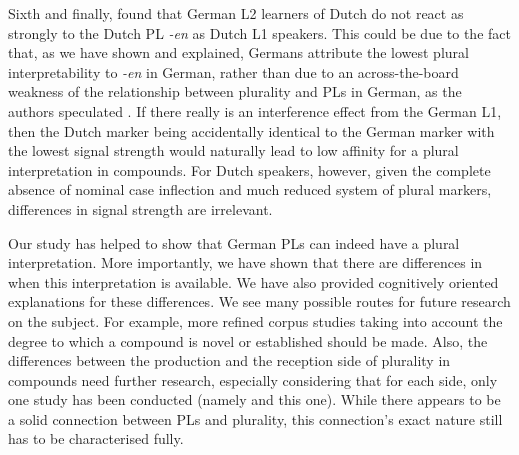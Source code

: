 Sixth and finally, \textcite{BangaEa2013a} found that German L2 learners of Dutch do not react as strongly to the Dutch PL \textit{-en} as Dutch L1 speakers.
This could be due to the fact that, as we have shown and explained, Germans attribute the lowest plural interpretability to \textit{-en} in German, rather than due to an across-the-board weakness of the relationship between plurality and PLs in German, as the authors speculated \parencite[45]{BangaEa2013a}.
If there really is an interference effect from the German L1, then the Dutch marker being accidentally identical to the German marker with the lowest signal strength would naturally lead to low affinity for a plural interpretation in compounds.
For Dutch speakers, however, given the complete absence of nominal case inflection and much reduced system of plural markers, differences in signal strength are irrelevant.

Our study has helped to show that German PLs can indeed have a plural interpretation.
More importantly, we have shown that there are differences in when this interpretation is available.
We have also provided cognitively oriented explanations for these differences.
We see many possible routes for future research on the subject.
For example, more refined corpus studies taking into account the degree to which a compound is novel or established should be made.
Also, the differences between the production and the reception side of plurality in compounds need further research, especially considering that for each side, only one study has been conducted (namely \citealt{KoesterEa2004} and this one).
While there appears to be a solid connection between PLs and plurality, this connection's exact nature still has to be characterised fully.
